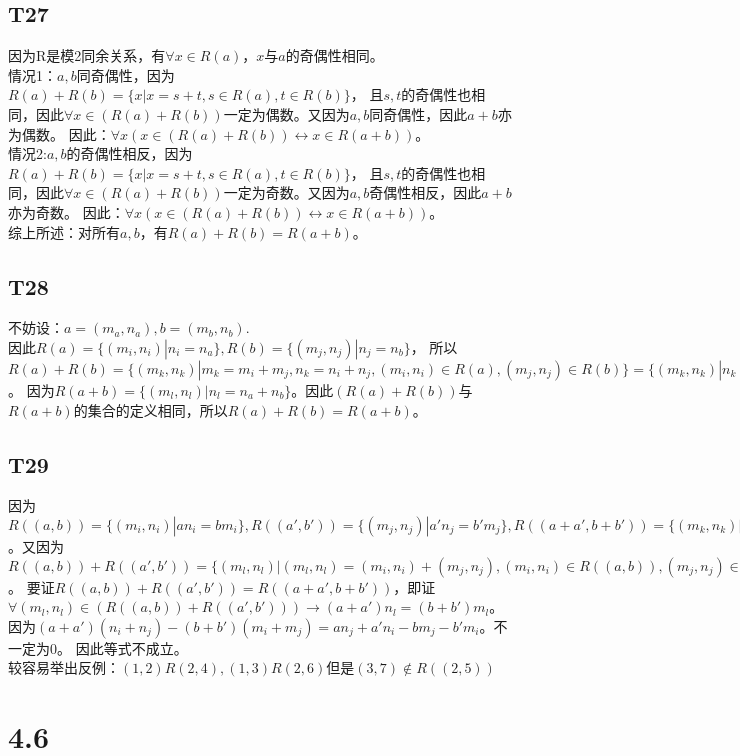 \documentclass{article}
\begin{document}
\subsection{T27}
因为R是模2同余关系，有$\forall x \in R(a)$，$x$与$a$的奇偶性相同。\\
情况1：$a, b$同奇偶性，因为$R(a) + R(b) = \{x | x = s + t, s \in R(a), t \in R(b)\}$，
且$s, t$的奇偶性也相同，因此$\forall x \in (R(a) + R(b))$一定为偶数。又因为$a, b$同奇偶性，因此$a + b$亦为偶数。
因此：$\forall x(x \in (R(a) + R(b)) \leftrightarrow x \in R(a + b))$。\\
情况2:$a, b$的奇偶性相反，因为$R(a) + R(b) = \{x | x = s + t, s \in R(a), t \in R(b)\}$，
且$s, t$的奇偶性也相同，因此$\forall x \in (R(a) + R(b))$一定为奇数。又因为$a, b$奇偶性相反，因此$a + b$亦为奇数。
因此：$\forall x(x \in (R(a) + R(b)) \leftrightarrow x \in R(a + b))$。\\
综上所述：对所有$a, b$，有$R(a) + R(b) = R(a + b)$。
\subsection{T28}
不妨设：$a = (m_a, n_a), b = (m_b, n_b)$.\\
因此$R(a) = \{(m_i, n_i) | n_i = n_a\}, R(b) = \{(m_j, n_j) | n_j = n_b\}$，
所以$R(a) + R(b) = \{(m_k, n_k) | m_k = m_i + m_j, n_k = n_i + n_j, (m_i, n_i) \in R(a), (m_j, n_j) \in R(b)\}
= \{(m_k, n_k) | n_k = n_a + n_b\}$。
因为$R(a + b) = \{(m_l, n_l) | n_l = n_a + n_b\}$。因此$(R(a) + R(b))$与$R(a+b)$的集合的定义相同，所以$R(a) + R(b) = R(a + b)$。
\subsection{T29}
因为$R((a, b)) = \{(m_i, n_i) | an_i = bm_i\}, R((a', b')) = \{(m_j, n_j) | a'n_j = b'm_j\},
R((a + a', b + b')) = \{(m_k, n_k) | (a + a')n_k = (b + b')m_k\}$。又因为$R((a, b)) + R((a', b'))
= \{(m_l, n_l) | (m_l, n_l) = (m_i, n_i) + (m_j, n_j), (m_i, n_i) \in R((a, b)), (m_j, n_j) \in R((a', b'))\}$。
要证$R((a, b)) + R((a', b')) = R((a + a', b + b'))$，即证$\forall (m_l, n_l) \in (R((a, b)) + R((a', b'))) \rightarrow
(a + a')n_l = (b + b')m_l$。因为$(a + a')(n_i + n_j) - (b + b')(m_i + m_j) = an_j + a'n_i - bm_j - b'm_i$。不一定为0。
因此等式不成立。\\
较容易举出反例：$(1, 2) R (2, 4), (1, 3) R (2, 6)$但是$(3, 7) \notin R((2, 5))$
\section{4.6}
\end{document}
